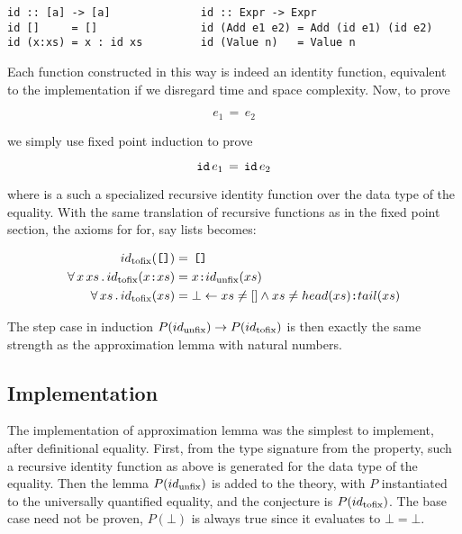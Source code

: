 \begin{verbatim}
id :: [a] -> [a]              id :: Expr -> Expr
id []     = []                id (Add e1 e2) = Add (id e1) (id e2)
id (x:xs) = x : id xs         id (Value n)   = Value n
\end{verbatim}

Each  function constructed in this way is indeed an identity
function, equivalent to the implementation  if we
disregard time and space complexity. Now, to prove

\begin{equation*}
e_1 \, = \, e_2
\end{equation*}

we simply use fixed point induction to prove

\begin{equation*}
\hs{id} \, e_1 \, = \, \hs{id} \, e_2
\end{equation*}

where  is a such a specialized recursive identity function over
the data type of the equality. With the same translation of recursive
functions as in the fixed point section, the axioms for  for, say
lists becomes:

\begin{align*}
            \tofix{id}(\hs{[]})   & \eq \, \hs{[]}                                                           \\
\faa{x}{xs} \tofix{id}(x\hs{:}xs) & \eq x\hs{:}\unfix{id}(xs)                                                \\
\fa{xs}     \tofix{id}(xs)        & \eq \bot  \leftarrow    xs \neq [] \wedge xs \neq head(xs)\hs{:}tail(xs) \\
\end{align*}

The step case in induction $P(id_{\mathrm{unfix}}) \rightarrow P(id_{\mathrm{tofix}})$
is then exactly the same strength as the approximation lemma with
natural numbers.

\subsection{Implementation} The implementation of approximation lemma
was the simplest to implement, after definitional equality. First,
from the type signature from the property, such a recursive identity
function as above is generated for the data type of the equality. Then
the lemma $P(id_{\mathrm{unfix}})$ is added to the theory, with $P$
instantiated to the universally quantified equality, and the
conjecture is $P(id_{\mathrm{tofix}})$. The base case need not be proven,
$P(\bot)$ is always true since it evaluates to $\bot=\bot$.

